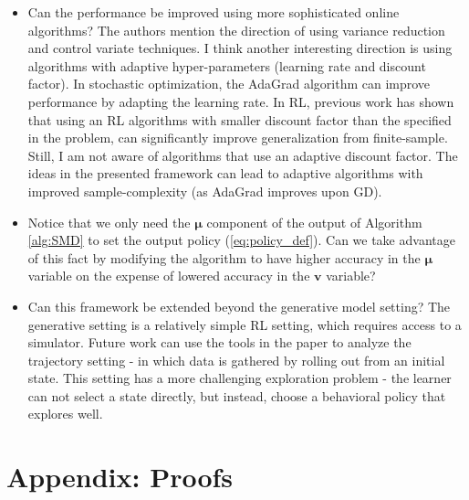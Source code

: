 \documentclass{article}
\newcommand{\vb}{\boldsymbol{v}}
\newcommand{\mub}{\boldsymbol{\mu}}
\begin{document}
\begin{itemize}


\item Can the performance be improved using more sophisticated online algorithms?
The authors mention the direction of using variance reduction and control variate techniques.
I think another interesting direction is using algorithms with adaptive hyper-parameters (learning rate and discount factor). In stochastic optimization, the AdaGrad algorithm can improve performance by adapting the learning rate.
In RL, previous work \citep{petrik2009biasing, jiang2015dependence, amit2020discount} has shown that using an RL algorithms with smaller discount factor than the specified in the problem, can significantly improve generalization from finite-sample.
Still, I am not aware of algorithms that use an adaptive discount factor.
The ideas in the presented framework can lead to adaptive algorithms with improved sample-complexity (as AdaGrad improves upon GD).

\item Notice that we only need the $\mub$ component of the output of Algorithm \ref{alg:SMD} to set the output policy (\ref{eq:policy_def}). Can we take advantage of this fact by modifying the algorithm to have higher accuracy in the $\mub$ variable on the expense of lowered accuracy in the $\vb$ variable?

\item 
Can this framework be extended beyond the generative model setting?
The generative setting is a relatively simple RL setting, which requires access to a simulator.  
Future work can use the tools in the paper to analyze the trajectory setting -  in which data is gathered by rolling out from an initial state.
This setting has a more challenging exploration problem - the learner can not select a state directly, but instead, choose a behavioral policy that explores well.






\end{itemize}



\section{Appendix: Proofs} \label{sect:proofs}
\end{document}
